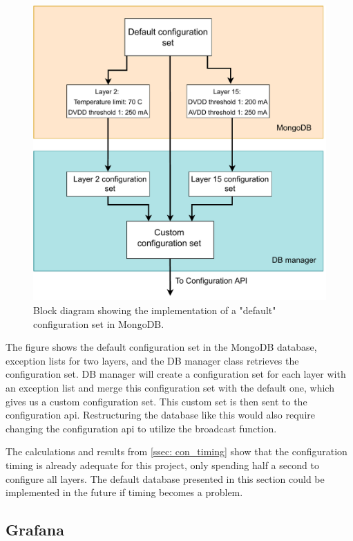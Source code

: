 \documentclass[main.tex]{subfiles}
\begin{document}
\begin{figure}[!ht]
    \centering
    \includegraphics[scale=0.55]{images/default_database.pdf}
    \caption{Block diagram showing the implementation of a "default" configuration set in MongoDB.}
    \label{fig: default_database}
\end{figure}
\FloatBarrier 

The figure shows the default configuration set in the MongoDB database, exception lists for two layers, and the DB manager class retrieves the configuration set. DB manager will create a configuration set for each layer with an exception list and merge this configuration set with the default one, which gives us a custom configuration set. This custom set is then sent to the configuration \gls{api}. Restructuring the database like this would also require changing the configuration \gls{api} to utilize the broadcast function.

The calculations and results from \autoref{ssec: con_timing} show that the configuration timing is already adequate for this project, only spending half a second to configure all layers. The default database presented in this section could be implemented in the future if timing becomes a problem.

\subsection{Grafana}
\end{document}
